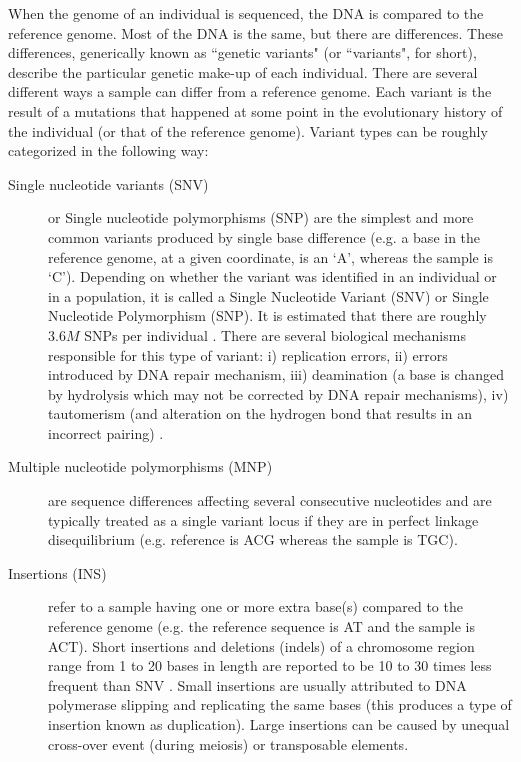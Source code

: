 When the genome of an individual is sequenced, the DNA is compared to the reference genome. 
Most of the DNA is the same, but there are differences. 
These differences, generically known as ``genetic variants" (or ``variants", for short), describe the particular genetic make-up of each individual. 
There are several different ways a sample can differ from a reference genome. 
Each variant is the result of a mutations that happened at some point in the evolutionary history of the individual (or that of the reference genome). Variant types can be roughly categorized in the following way:

\begin{description}

	\item[Single nucleotide variants (SNV)] or Single nucleotide polymorphisms (SNP) are the simplest and more common variants produced by single base difference (e.g. a base in the reference genome, at a given coordinate,  is an `A', whereas the sample is `C'). 
	Depending on whether the variant was identified in an individual or in a population, it is called a Single Nucleotide Variant (SNV) or Single Nucleotide Polymorphism (SNP). 
	It is estimated that there are roughly $3.6M$ SNPs per individual \cite{10002012integrated}. 
	There are several biological mechanisms responsible for this type of variant: 
	i) replication errors, 
	ii) errors introduced by DNA repair mechanism, 
	iii) deamination (a base is changed by hydrolysis which may not be corrected by DNA repair mechanisms), 
	iv) tautomerism (and alteration on the hydrogen bond that results in an incorrect pairing) \cite{griffiths2005introduction}.

	\item[Multiple nucleotide polymorphisms (MNP)] are sequence differences affecting several consecutive nucleotides and are typically treated as a single variant locus if they are in perfect linkage disequilibrium (e.g. reference is ACG whereas the sample is TGC).

	\item[Insertions (INS)] refer to a sample having one or more extra base(s) compared to the reference genome (e.g. the reference sequence is AT and the sample is ACT). 
	Short insertions and deletions (indels) of a chromosome region range from 1 to 20 bases in length are reported to be 10 to 30 times less frequent than SNV \cite{10002012integrated}. 
	Small insertions are usually attributed to DNA polymerase slipping and replicating the same bases (this produces a type of insertion known as duplication). 
	Large insertions can be caused by unequal cross-over event (during meiosis) or transposable elements.


\end{description}

